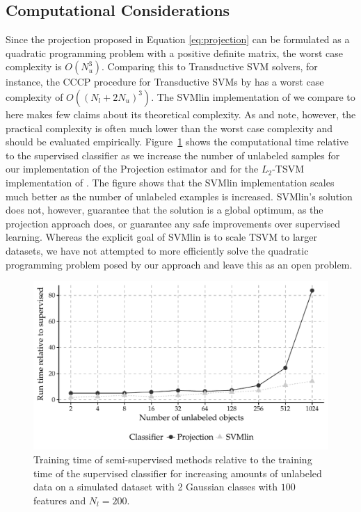 \documentclass[smallcondensed]{svjour3}\usepackage[]{graphicx}\usepackage[]{color}
\makeatletter
\def\maxwidth{ %
  \ifdim\Gin@nat@width>\linewidth
    \linewidth
  \else
    \Gin@nat@width
  \fi
}
\newenvironment{knitrout}{}{} %
\makeatother
\begin{document}
\subsection{Computational Considerations}
Since the projection proposed in Equation \eqref{eq:projection} can be formulated as a quadratic programming problem with a positive definite matrix, the worst case complexity is $O(N_u^3)$. Comparing this to Transductive SVM solvers, for instance, the CCCP procedure for Transductive SVMs by \cite{Collobert2006} has a worst case complexity of $O((N_l+2N_u)^3)$. The SVMlin implementation of \citet{Sindhwani2006} we compare to here makes few claims about its theoretical complexity. As \citet{Collobert2006} and \citet{Sindhwani2006} note, however, the practical complexity is often much lower than the worst case complexity and should be evaluated empirically. Figure~\ref{fig:timecomplexity} shows the computational time relative to the supervised classifier as we increase the number of unlabeled samples for our implementation of the Projection estimator and for the $L_2$-TSVM implementation of \citet{Sindhwani2006}. The figure shows that the SVMlin implementation scales much better as the number of unlabeled examples is increased. SVMlin's solution does not, however, guarantee that the solution is a global optimum, as the projection approach does, or guarantee any safe improvements over supervised learning. Whereas the explicit goal of SVMlin is to scale TSVM to larger datasets, we have not attempted to more efficiently solve the quadratic programming problem posed by our approach and leave this as an open problem.

\begin{knitrout}
\color{fgcolor}\begin{figure}
\includegraphics[width=\maxwidth]{timecomplexity-1} \caption[Training time of semi-supervised methods relative to the training time of the supervised classifier for increasing amounts of unlabeled data on a simulated dataset with 2 Gaussian classes with $100$ features and $N_l=200$]{Training time of semi-supervised methods relative to the training time of the supervised classifier for increasing amounts of unlabeled data on a simulated dataset with 2 Gaussian classes with $100$ features and $N_l=200$.}\label{fig:timecomplexity}
\end{figure}


\end{knitrout}
\end{document}
